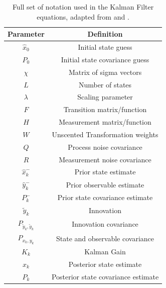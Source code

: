     
\begin{table}[H]
  \begin{center}
    \label{tab:table1}
    \begin{tabular}{c|c} %
      \textbf{Parameter} & \textbf{Definition}\\
      \hline
      \textbf{$\hat{x}_0$} & Initial state guess\\
      \hline
      \textbf{$P_0$} & Initial state covariance guess\\
      \hline
      \textbf{$\chi$} & Matrix of sigma vectors\\
      \hline
      \textbf{$L$} & Number of states\\
      \hline
      \textbf{$\lambda$} & Scaling parameter\\
      \hline
      \textbf{$F$} & Transition matrix/function\\
      \hline
      \textbf{$H$} & Measurement matrix/function\\
      \hline
      \textbf{$W$} & Unscented Transformation weights\\
      \hline
      \textbf{$Q$} & Process noise covariance\\
      \hline
      \textbf{$R$} & Measurement noise covariance\\
      \hline
      \textbf{$\hat{x}_k^-$} & Prior state estimate\\
      \hline
      \textbf{$\hat{y}_k^-$} & Prior observable estimate\\
      \hline
      \textbf{$P_k^-$} & Prior state covariance estimate\\
      \hline
      \textbf{$\tilde{y}_k$} & Innovation\\
      \hline
      \textbf{$P_{\tilde{y}_k, \tilde{y}_k}$} & Innovation covariance\\
      \hline
      \textbf{$P_{x_k, y_k}$} & State and observable covariance\\
      \hline
      \textbf{$K_k$} & Kalman Gain\\
      \hline
      \textbf{$\hat{x}_k$} & Posterior state estimate\\
      \hline
      \textbf{$P_k$} & Posterior state covariance estimate
    \end{tabular}
    \caption{Full set of notation used in the Kalman Filter equations, adapted from \cite{SimonHaykinText} and \cite{VanMereChapter}.}
    \label{table:KF_Notation}
  \end{center}
\end{table}
    
